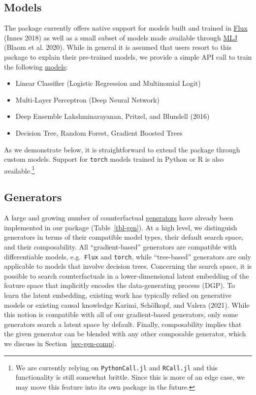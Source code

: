 \documentclass{juliacon}
\providecommand{\tightlist}{%
  \setlength{\itemsep}{0pt}\setlength{\parskip}{0pt}}\usepackage{longtable,booktabs,array}
\begin{document}
\subsection{Models}\label{models}

The package currently offers native support for models built and trained
in \href{https://fluxml.ai/}{Flux} (Innes 2018) as well as a small
subset of models made available through
\href{https://alan-turing-institute.github.io/MLJ.jl/dev/}{MLJ} (Blaom
et al. 2020). While in general it is assumed that users resort to this
package to explain their pre-trained models, we provide a simple API
call to train the following
\href{https://juliatrustworthyai.github.io/CounterfactualExplanations.jl/v0.1/tutorials/model_catalogue/}{models}:

\begin{itemize}
\tightlist
\item
  Linear Classifier (Logistic Regression and Multinomial Logit)
\item
  Multi-Layer Perceptron (Deep Neural Network)
\item
  Deep Ensemble Lakshminarayanan, Pritzel, and Blundell (2016)
\item
  Decision Tree, Random Forest, Gradient Boosted Trees
\end{itemize}

As we demonstrate below, it is straightforward to extend the package
through custom models. Support for \texttt{torch} models trained in
Python or R is also available.\footnote{We are currently relying on
  \texttt{PythonCall.jl} and \texttt{RCall.jl} and this functionality is
  still somewhat brittle. Since this is more of an edge case, we may
  move this feature into its own package in the future.}

\subsection{Generators}\label{sec-gen}

A large and growing number of counterfactual
\href{https://juliatrustworthyai.github.io/CounterfactualExplanations.jl/v0.1/explanation/generators/overview/}{generators}
have already been implemented in our package (Table~\ref{tbl-gen}). At a
high level, we distinguish generators in terms of their compatible model
types, their default search space, and their composability. All
``gradient-based'' generators are compatible with differentiable models,
e.g.~\texttt{Flux} and \texttt{torch}, while ``tree-based'' generators
are only applicable to models that involve decision trees. Concerning
the search space, it is possible to search counterfactuals in a
lower-dimensional latent embedding of the feature space that implicitly
encodes the data-generating process (DGP). To learn the latent
embedding, existing work has typically relied on generative models or
existing causal knowledge Karimi, Schölkopf, and Valera (2021). While
this notion is compatible with all of our gradient-based generators,
only some generators search a latent space by default. Finally,
composability implies that the given generator can be blended with any
other composable generator, which we discuss in
Section~\ref{sec-gen-comp}.
\end{document}
